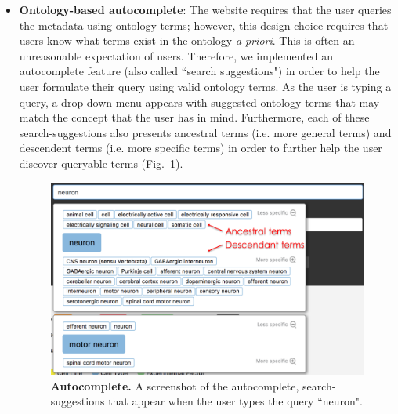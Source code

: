 \begin{itemize}
\item \textbf{Ontology-based autocomplete}: The website requires that the user queries the metadata using ontology terms; however, this design-choice requires that users know what terms exist in the ontology \textit{a priori}.  This is often an unreasonable expectation of users. Therefore, we implemented an autocomplete feature (also called ``search suggestions") in order to help the user formulate their query using valid ontology terms. As the user is typing a query, a drop down menu appears with suggested ontology terms that may match the concept that the user has in mind.  Furthermore, each of these search-suggestions also presents ancestral terms (i.e. more general terms) and descendent terms (i.e. more specific terms) in order to further help the user discover queryable terms  (Fig.~\ref{fig:autocomplete}).  
\begin{figure}[htbp]
\centering
\includegraphics[width=12cm]{figures/autocomplete.pdf}  
\caption{\textbf{Autocomplete.} A screenshot of the autocomplete, search-suggestions that appear when the user types the query ``neuron".}
\label{fig:autocomplete}
\end{figure}


\end{itemize}
